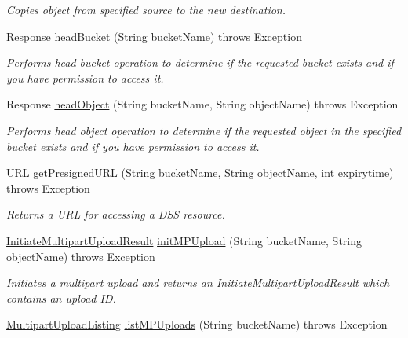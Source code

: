 \begin{DoxyCompactItemize}
\begin{DoxyCompactList}\small\item\em Copies object from specified source to the new destination. \end{DoxyCompactList}\item 
Response \hyperlink{classorg_1_1jcs_1_1dss_1_1main_1_1DssConnection_aac9f7f5d23874eeaa61c466ce1a0f579}{head\+Bucket} (String bucket\+Name)  throws Exception 
\begin{DoxyCompactList}\small\item\em Performs head bucket operation to determine if the requested bucket exists and if you have permission to access it. \end{DoxyCompactList}\item 
Response \hyperlink{classorg_1_1jcs_1_1dss_1_1main_1_1DssConnection_a0bc9fd6855f69db8d2a37a0be752c19d}{head\+Object} (String bucket\+Name, String object\+Name)  throws Exception 
\begin{DoxyCompactList}\small\item\em Performs head object operation to determine if the requested object in the specified bucket exists and if you have permission to access it. \end{DoxyCompactList}\item 
U\+RL \hyperlink{classorg_1_1jcs_1_1dss_1_1main_1_1DssConnection_a3fcbd474e33b3f5368cd91e2af1c8ff4}{get\+Presigned\+U\+RL} (String bucket\+Name, String object\+Name, int expirytime)  throws Exception 
\begin{DoxyCompactList}\small\item\em Returns a U\+RL for accessing a D\+SS resource. \end{DoxyCompactList}\item 
\hyperlink{classorg_1_1jcs_1_1dss_1_1main_1_1InitiateMultipartUploadResult}{Initiate\+Multipart\+Upload\+Result} \hyperlink{classorg_1_1jcs_1_1dss_1_1main_1_1DssConnection_ad24351a0b8ecaf03f9ed6bb02506f04a}{init\+M\+P\+Upload} (String bucket\+Name, String object\+Name)  throws Exception 
\begin{DoxyCompactList}\small\item\em Initiates a multipart upload and returns an \hyperlink{classorg_1_1jcs_1_1dss_1_1main_1_1InitiateMultipartUploadResult}{Initiate\+Multipart\+Upload\+Result} which contains an upload ID. \end{DoxyCompactList}\item 
\hyperlink{classorg_1_1jcs_1_1dss_1_1main_1_1MultipartUploadListing}{Multipart\+Upload\+Listing} \hyperlink{classorg_1_1jcs_1_1dss_1_1main_1_1DssConnection_a15fe3ef4a3a6bd2bb64ef8e6ed38a59b}{list\+M\+P\+Uploads} (String bucket\+Name)  throws Exception 

\end{DoxyCompactItemize}
